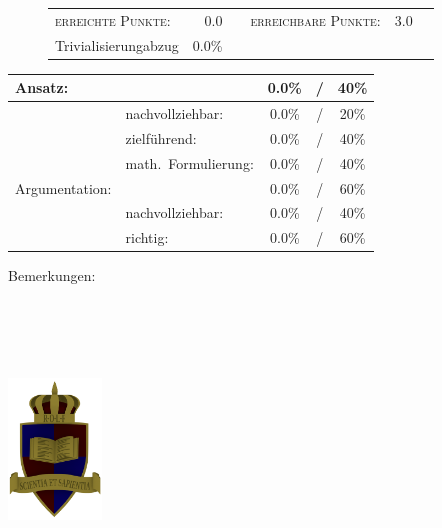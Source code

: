 \documentclass{article}
\begin{document}
\vspace{-0.5cm}
\begin{figure}[h!]
\begin{tabular}{lrcrcr}
\textsc{erreichte Punkte:} &0.0& & \textsc{erreichbare Punkte:} &3.0\\
\small Trivialisierungabzug  & 0.0\% & & &
\end{tabular}
\end{figure}
\vspace{-0.1cm}
\begin{minipage}[t]{0.6\textwidth}
\flushleft
\begin{tabular}{l|lccc}
Ansatz:& &0.0\%&/&40\%\\\hline
&nachvollziehbar:&0.0\%&/&20\%\\
&zielf{\"u}hrend:&0.0\%&/&40\%\\
&math.~Formulierung:& 0.0\%&/&40\%\\\hline\hline
Argumentation:& &0.0\%&/&60\%\\\hline
&nachvollziehbar:&0.0\%&/&40\%\\
&richtig:&0.0\%&/&60\%\\\hline
\end{tabular}
\end{minipage}
\hfill
\begin{minipage}[t]{0.4\textwidth}
	\vspace{-1.75cm}
	Bemerkungen:\\\vspace*{0.2cm}
	\underline{\hspace{0.75\textwidth}}\\\vspace*{0.2cm}
	\underline{\hspace{0.75\textwidth}}
	\\\vspace*{0.2cm}
	\underline{\hspace{0.75\textwidth}}
	\\\vspace*{0.2cm}
	\underline{\hspace{0.75\textwidth}}
	\\\vspace*{0.2cm}
	\underline{\hspace{0.75\textwidth}}
\end{minipage}
	\vspace{0.5cm}\clearpage\vspace*{-2cm}
\parbox{4cm}{\includegraphics[width=2.5cm]{../images/ROLF4.png}}
\end{document}
